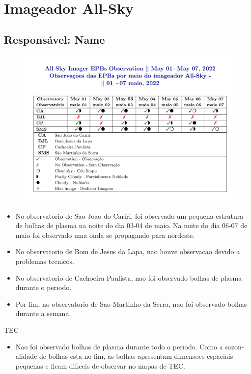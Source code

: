 \documentclass[a4paper, 10pt]{article}
\begin{document}
    \section{Imageador All-Sky} 
 \subsection{Responsável: Name} 
 
\begin{figure}[H]
    
                        \centering
   
                             \includegraphics[width=14cm]{./figures//figureImager_0.png}

                        \end{figure}

                     \begin{itemize} 
 \item  No observatorio de Sao Joao do Cariri, foi observado um pequena estrutura de bolhas de plasma na noite do dia 03-04 de maio. Na noite do dia 06-07 de maio foi observado uma onda se propagando para nordeste. 
\item  No observatorio de Bom de Jesus da Lapa, nao houve observacao devido a problemas tecnicos. 
\item  No observatorio de Cachoeira Paulista, nao foi observado bolhas de plasma durante o perıodo. 
\item  Por fim, no observatorio de Sao Martinho da Serra, nao foi observado bolhas durante a semana. 
\end{itemize} 
 TEC 
\begin{itemize} 
 \item  Nao foi observado bolhas de plasma durante todo o perıodo. Como a sazon- alidade de bolhas esta no fim, as bolhas apresentam dimensoes espaciais pequenas e ficam difıceis de observar no mapas de TEC. 
\end{itemize} 
\end{document}
